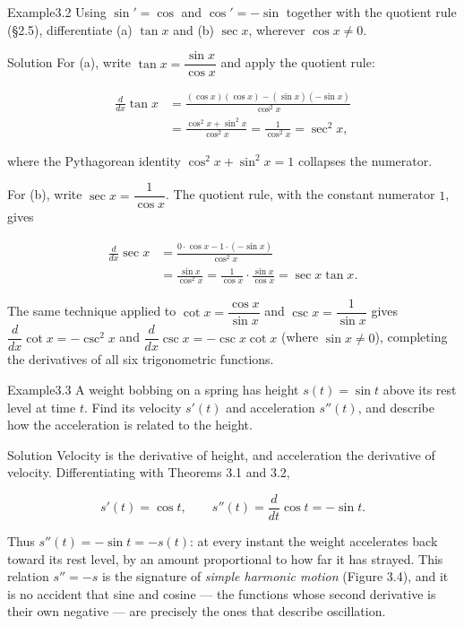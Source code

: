 \begin{hkworkedexample}
\begin{hkexample}{Example}{3.2}{}
Using \(\sin' = \cos\) and \(\cos' = -\sin\) together with the quotient rule (§2.5), differentiate (a) \(\tan x\) and (b) \(\sec x\), wherever \(\cos x \ne 0\).
\end{hkexample}
\begin{hksolution}{Solution}{}{}
For (a), write \(\tan x = \dfrac{\sin x}{\cos x}\) and apply the quotient rule:

\[ \begin{aligned}
          \frac{d}{dx}\tan x
            &= \frac{(\cos x)(\cos x) - (\sin x)(-\sin x)}{\cos^{2} x} \\[2pt]
            &= \frac{\cos^{2} x + \sin^{2} x}{\cos^{2} x}
             = \frac{1}{\cos^{2} x} = \sec^{2} x,
        \end{aligned} \]

where the Pythagorean identity \(\cos^{2} x + \sin^{2} x = 1\) collapses the numerator.

For (b), write \(\sec x = \dfrac{1}{\cos x}\). The quotient rule, with the constant numerator \(1\), gives

\[ \begin{aligned}
          \frac{d}{dx}\sec x
            &= \frac{0 \cdot \cos x - 1 \cdot (-\sin x)}{\cos^{2} x} \\[2pt]
            &= \frac{\sin x}{\cos^{2} x}
             = \frac{1}{\cos x}\cdot\frac{\sin x}{\cos x}
             = \sec x \tan x.
        \end{aligned} \]

The same technique applied to \(\cot x = \dfrac{\cos x}{\sin x}\) and \(\csc x = \dfrac{1}{\sin x}\) gives \(\dfrac{d}{dx}\cot x = -\csc^{2} x\) and \(\dfrac{d}{dx}\csc x = -\csc x \cot x\) (where \(\sin x \ne 0\)), completing the derivatives of all six trigonometric functions.
\end{hksolution}
\end{hkworkedexample}
\begin{hkworkedexample}
\begin{hkexample}{Example}{3.3}{}
A weight bobbing on a spring has height \(s(t) = \sin t\) above its rest level at time \(t\). Find its velocity \(s'(t)\) and acceleration \(s''(t)\), and describe how the acceleration is related to the height.
\end{hkexample}
\begin{hksolution}{Solution}{}{}
Velocity is the derivative of height, and acceleration the derivative of velocity. Differentiating with Theorems 3.1 and 3.2,

\[ s'(t) = \cos t, \qquad s''(t) = \frac{d}{dt}\cos t = -\sin t. \]

Thus \(s''(t) = -\sin t = -s(t)\): at every instant the weight accelerates back toward its rest level, by an amount proportional to how far it has strayed. This relation \(s'' = -s\) is the signature of \emph{simple harmonic motion} (Figure 3.4), and it is no accident that sine and cosine — the functions whose second derivative is their own negative — are precisely the ones that describe oscillation.
\end{hksolution}
\end{hkworkedexample}
